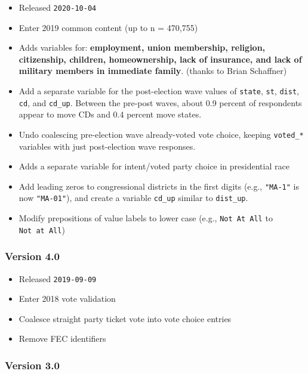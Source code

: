 \documentclass[10pt,article,oneside]{memoir}
\theoremstyle{definition}
\begin{document}
\begin{itemize}
\tightlist
\item
  Released \texttt{2020-10-04}
\item
  Enter 2019 common content (up to n = 470,755)
\item
  Adds variables for: \textbf{employment, union membership, religion,
  citizenship, children, homeownership, lack of insurance, and lack of
  military members in immediate family}. (thanks to Brian Schaffner)
\item
  Add a separate variable for the post-election wave values of
  \texttt{state}, \texttt{st}, \texttt{dist}, \texttt{cd}, and
  \texttt{cd\_up}. Between the pre-post waves, about 0.9 percent of
  respondents appear to move CDs and 0.4 percent move states.
\item
  Undo coalescing pre-election wave already-voted vote choice, keeping
  \texttt{voted\_*} variables with just post-election wave responses.
\item
  Adds a separate variable for intent/voted party choice in presidential
  race
\item
  Add leading zeros to congressional districts in the first digits
  (e.g., \texttt{"MA-1"} is now \texttt{"MA-01"}), and create a variable
  \texttt{cd\_up} similar to \texttt{dist\_up}.
\item
  Modify prepositions of value labels to lower case (e.g.,
  \texttt{Not\ At\ All} to \texttt{Not\ at\ All})
\end{itemize}

\hypertarget{version-4.0}{%
\subsubsection{Version 4.0}\label{version-4.0}}

\begin{itemize}
\tightlist
\item
  Released \texttt{2019-09-09}
\item
  Enter 2018 vote validation
\item
  Coalesce straight party ticket vote into vote choice entries
\item
  Remove FEC identifiers
\end{itemize}

\hypertarget{version-3.0}{%
\subsubsection{Version 3.0}\label{version-3.0}}
\end{document}
